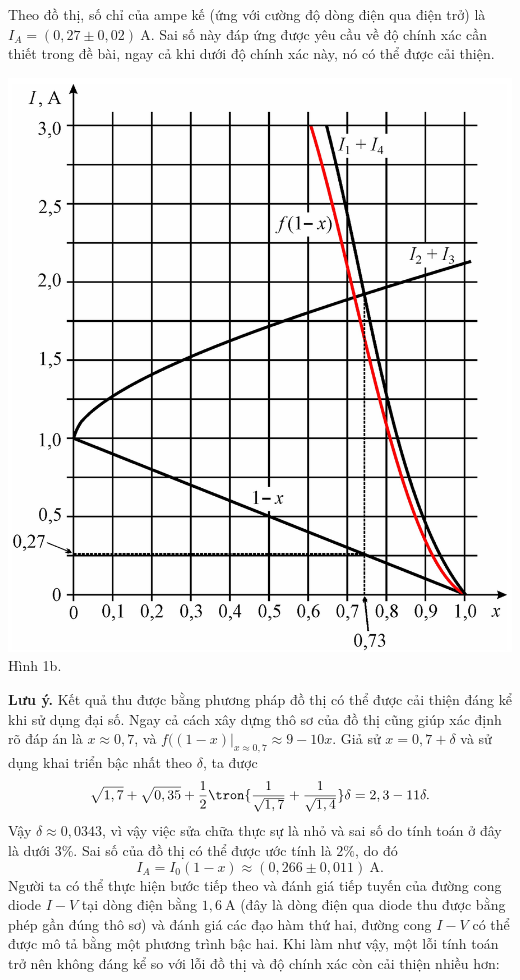 \begin{loigiai}
\begin{enumerate}[1)]
    Theo đồ thị, số chỉ của ampe kế (ứng với cường độ dòng điện qua điện trở) là $I_A = (0,27 \pm 0,02)~\mathrm{A}$. Sai số này đáp ứng được yêu cầu về độ chính xác cần thiết trong đề bài, ngay cả khi dưới độ chính xác này, nó có thể được cải thiện.
    \begin{center}
    \includegraphics[scale=0.7]{Anh/IOM2018_2.jpg}
       \\ Hình 1b.
    \end{center}
\textbf{Lưu ý.} Kết quả thu được bằng phương pháp đồ thị có thể được cải thiện đáng kể khi sử dụng đại số. Ngay cả cách xây dựng thô sơ của đồ thị cũng giúp xác định rõ đáp án là  $x \approx 0,7$, và  $\left. f((1-x)\right|_{x \approx 0,7} \approx 9 - 10x$. Giả sử $x = 0,7 + \delta$ và sử dụng khai triển bậc nhất theo $\delta$, ta được 
\[\sqrt{1,7} + \sqrt{0,35} + \dfrac{1}{2} \tron{\dfrac{1}{\sqrt{1,7}} + \dfrac{1}{\sqrt{1,4}}} \delta = 2,3 - 11\delta.\]
Vậy $\delta \approx 0,0343$, vì vậy việc sửa chữa thực sự là nhỏ và sai số do tính toán ở đây là dưới $3 \%$. Sai số của đồ thị có thể được ước tính là $2\%$, do đó 
\[I_A = I_0 (1-x) \approx (0,266 \pm 0,011)~\mathrm{A}.\]
Người ta có thể thực hiện bước tiếp theo và đánh giá tiếp tuyến của đường cong diode $I-V$ tại dòng điện bằng $1,6~ \mathrm{A}$ (đây là dòng điện qua diode thu được bằng phép gần đúng thô sơ) và đánh giá các đạo hàm thứ hai, đường cong $I-V$ có thể được mô tả bằng một phương trình bậc hai. Khi làm như vậy, một lỗi tính toán trở nên không đáng kể so với lỗi đồ thị và độ chính xác còn cải thiện nhiều hơn: 

\end{enumerate}
\end{loigiai}
